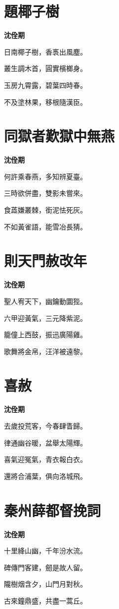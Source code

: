 \documentclass[12pt,a4paper]{ctexbook}
\begin{document}
\section{題椰子樹}
\textbf{沈佺期}\par\vspace{0.5em}
日南椰子樹，香褭出風塵。\par
叢生調木首，圓實檳榔身。\par
玉房九霄露，碧葉四時春。\par
不及塗林果，移根隨漢臣。\par

\section{同獄者歎獄中無燕}
\textbf{沈佺期}\par\vspace{0.5em}
何許乘春燕，多知辨夏臺。\par
三時欲併盡，雙影未嘗來。\par
食蕋嫌叢棘，銜泥怯死灰。\par
不如黃雀語，能雪冶長猜。\par

\section{則天門赦改年}
\textbf{沈佺期}\par\vspace{0.5em}
聖人宥天下，幽鑰動圜狴。\par
六甲迎黃氣，三元降紫泥。\par
籠僮上西鼓，振迅廣陽雞。\par
歌舞將金帛，汪洋被遠黎。\par

\section{喜赦}
\textbf{沈佺期}\par\vspace{0.5em}
去歲投荒客，今春肆眚歸。\par
律通幽谷暖，盆舉太陽輝。\par
喜氣迎冤氣，青衣報白衣。\par
還將合浦葉，俱向洛城飛。\par

\section{秦州薛都督挽詞}
\textbf{沈佺期}\par\vspace{0.5em}
十里絳山幽，千年汾水流。\par
碑傳門客建，劒是故人留。\par
隴樹烟含夕，山門月對秋。\par
古來鐘鼎盛，共盡一蒿丘。\par
\end{document}
